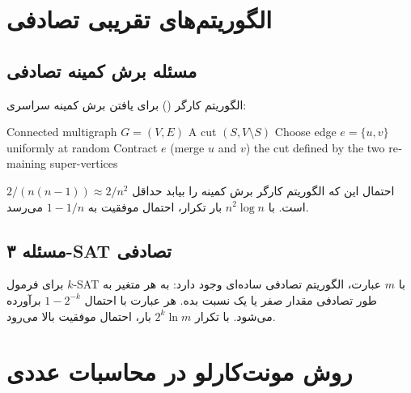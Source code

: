 \documentclass{matinbook}
\begin{document}
    \section{الگوریتم‌های تقریبی تصادفی}
    
    \subsection{مسئله برش کمینه تصادفی}
    
    الگوریتم کارگر
    () برای یافتن
    برش کمینه سراسری:
    
    \begin{latin}
        \begin{algorithm}
            \begin{algorithmic}[1]
                \Require Connected multigraph $G = (V, E)$
                \Ensure A cut $(S, V \setminus S)$
                \State Choose edge $e = \{u, v\}$ uniformly at random
                \State Contract $e$ (merge $u$ and $v$)
                \EndWhile
                \State \Return the cut defined by the two remaining super-vertices
            \end{algorithmic}
        \end{algorithm}
    \end{latin}
    
    \begin{theorem}
        احتمال این که الگوریتم کارگر
        برش کمینه را بیابد حداقل
        $2/(n(n-1)) \approx 2/n^{2}$ است.
        با $n^{2} \log n$ بار تکرار،
        احتمال موفقیت به $1 - 1/n$ می‌رسد.
        \label{thm:karger-analysis}
    \end{theorem}
    
    \subsection{مسئله ۳-SAT تصادفی}
    
    برای فرمول $k$-SAT با $m$ عبارت،
    الگوریتم تصادفی ساده‌ای وجود دارد:
    به هر متغیر به طور تصادفی مقدار صفر یا یک
    نسبت بده. هر عبارت با احتمال $1 - 2^{-k}$
    برآورده می‌شود. با تکرار $2^{k} \ln m$ بار،
    احتمال موفقیت بالا می‌رود.
    
    \section{روش مونت‌کارلو در محاسبات عددی}
    
\end{document}
